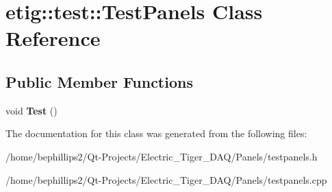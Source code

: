 \hypertarget{classetig_1_1test_1_1_test_panels}{}\section{etig\+:\+:test\+:\+:Test\+Panels Class Reference}
\label{classetig_1_1test_1_1_test_panels}
\subsection*{Public Member Functions}
\begin{DoxyCompactItemize}
\item 
void {\bfseries Test} ()\hypertarget{classetig_1_1test_1_1_test_panels_ae437513aa805be6ba2c046e3c83b862a}{}\label{classetig_1_1test_1_1_test_panels_ae437513aa805be6ba2c046e3c83b862a}

\end{DoxyCompactItemize}


The documentation for this class was generated from the following files\+:\begin{DoxyCompactItemize}
\item 
/home/bephillips2/\+Qt-\/\+Projects/\+Electric\+\_\+\+Tiger\+\_\+\+D\+A\+Q/\+Panels/testpanels.\+h\item 
/home/bephillips2/\+Qt-\/\+Projects/\+Electric\+\_\+\+Tiger\+\_\+\+D\+A\+Q/\+Panels/testpanels.\+cpp\end{DoxyCompactItemize}
